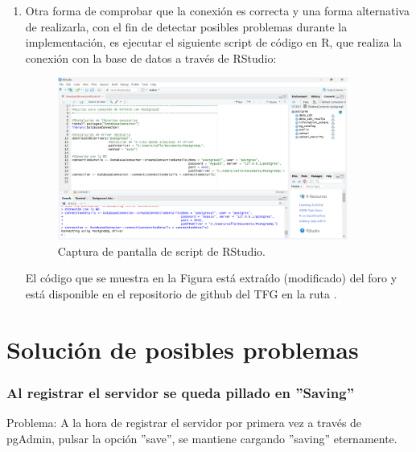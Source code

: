 \begin{enumerate}
    \item Otra forma de comprobar que la conexión es correcta y una forma alternativa de realizarla, con el fin de detectar posibles problemas durante la implementación, es ejecutar el siguiente script de código en R, que realiza la conexión con la base de datos a través de RStudio:
    
    \begin{figure}[H]
    \centering
    \includegraphics[width=0.90\textwidth]{figures/RStudio.png}
     \caption{Captura de pantalla de script de RStudio.}
    \label{fig:RStudio}
    \end{figure}

    El código que se muestra en la Figura está extraído (modificado) del foro \cite{forumBroadseaDB} y está disponible en el repositorio de github del TFG en la ruta  \cite{vallealonsodc}.
    
\end{enumerate}

\section{Solución de posibles problemas}

\subsubsection{Al registrar el servidor se queda pillado en ''Saving''}
Problema: A la hora de registrar el servidor por primera vez a través de pgAdmin, pulsar la opción ''save'', se mantiene cargando ''saving'' eternamente.

